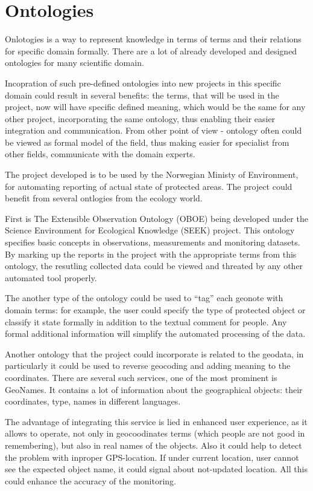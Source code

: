 \documentclass[12pt,a4paper]{article}
\begin{document}
\section{Ontologies}
Onlotogies is a way to represent knowledge in terms of terms and their
relations for specific domain formally. There are a lot of already developed
and designed ontologies for many scientific domain.

Incopration of such pre-defined ontologies into new projects in this specific domain could
result in several benefits: the terms, that will be used in the project,
now will have specific defined meaning, which would be the same for
any other project, incorporating the same ontology, thus enabling their
easier integration and communication. From other point of view - ontology
often could be viewed as formal model of the field, thus making easier for
specialist from other fields, communicate with the domain experts.

The project developed is to be used by the Norwegian Ministy of Environment,
for automating reporting of actual state of protected areas. The project
could benefit from several ontlogies from the ecology world.

First is The Extensible Observation Ontology (OBOE) being developed under the Science
Environment for Ecological Knowledge (SEEK) project. This ontology
specifies basic concepts in observations, measurements and monitoring datasets.
By marking up the reports in the project with the appropriate terms from this
ontology, the resutling collected data could be viewed and threated by any other
automated tool properly.

The another type of the ontology could be used to ``tag'' each geonote with
domain terms: for example, the user could specify the type of protected object
or classify it state formally in addition to the textual comment for people.
Any formal additional information will simplify the automated processing of
the data.

Another ontology that the project could incorporate is related to the geodata,
in particularly it could be used to reverse geocoding and adding meaning to
the coordinates. There are several such services, one of the most prominent is
GeoNames. It contains a lot of information about the geographical objects:
their coordinates, type, names in different languages.

The advantage of integrating this service is lied in enhanced user experience,
as it allows to operate, not only in geocoodinates terms (which people are not good
in remembering), but also in real names of the objects.
Also it could help to detect the problem with inproper GPS-location. If under
current location, user cannot see the expected object name, it could signal
about not-updated location. All this could enhance the accuracy of the monitoring.
\end{document}

